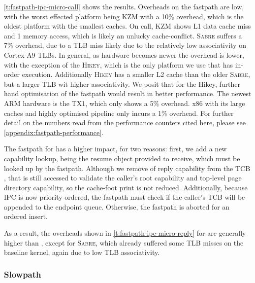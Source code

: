 \cref{t:fastpath-ipc-micro-call} shows the results.
Overheads on the \call fastpath are low, with the worst effected platform being
\textsc{KZM} with a 10\% overhead, which is the oldest platform with the smallest caches. On call,
\textsc{KZM} shows L1 data cache miss and 1 memory access, which is likely an unlucky cache-conflict. \textsc{Sabre} suffers a 7\% overhead, due to a \gls{TLB} miss likely
due to the relatively low associativity on Cortex-A9 \glspl{TLB}.  In general, as hardware becomes newer the
overhead is lower, with the exception of the \textsc{Hikey}, which is the only platform we use that has 
in-order execution. Additionally \textsc{Hikey} has a smaller L2 cache than the older \textsc{Sabre},
but a larger \gls{TLB} wit higher associativity.
We posit that for the Hikey, further hand optimisation of the fastpath would result in better
performance. The newest ARM hardware is the TX1, which only shows a 5\% overhead. x86 with its large
caches and highly optimised pipeline only incurs a 1\% overhead. For further detail on the
numbers read from the performance counters cited here, please see
\cref{appendix:fastpath-performance}.

The fastpath for \replyrecv has a higher impact, for two reasons: first, we add a new capability
lookup, being the resume object provided to receive, which must be looked up by the \replyrecv
fastpath. Although we remove of reply capability from the \gls{TCB}
\cnode, that \cnode is still accessed to validate the caller's root \cnode capability
and top-level page directory capability, so the cache-foot print is not reduced. Additionally, because
\gls{IPC} is now priority ordered, the fastpath must check if the callee's \gls{TCB} will be appended to the
endpoint queue. Otherwise, the fastpath is aborted for an ordered insert. 

As a result, the overheads shown in \cref{t:fastpath-ipc-micro-reply} for \replyrecv are generally higher
than \call, except for \textsc{Sabre}, which already suffered some \gls{TLB} misses on
the baseline kernel, again due to low \gls{TLB} associativity.
\clearpage

\subsubsection{Slowpath}
\label{eval:slowpath}

